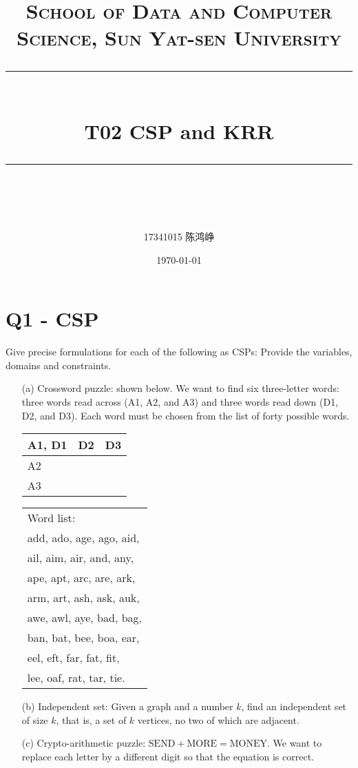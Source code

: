 \documentclass[a4paper, 11pt]{article}
\title{
\normalfont \normalsize
\textsc{School of Data and Computer Science, Sun Yat-sen University} \\ [25pt] %
\rule{\textwidth}{0.5pt} \\[0.4cm] %
\huge  T02 CSP and KRR\\ %
\rule{\textwidth}{2pt} \\[0.5cm] %
\author{17341015 陈鸿峥}
\date{\normalsize\today}
}
\begin{document}
\maketitle
\tableofcontents
\newpage

\begin{flushleft}
\end{flushleft}

\section{Q1 - CSP}
\begin{question}\normalfont
    Give precise formulations for each of the following as CSPs: Provide the variables, domains and constraints.
    \begin{itemize}
    \item [(a)] Crossword puzzle: shown below. We want to find six three-letter words: three words read across (A1, A2, and A3) and three words read down (D1, D2, and D3). Each word must be chosen from the list of forty possible words.
    \begin{center}
        {\scriptsize
        \begin{tabular}{|p{1cm}|p{1cm}|p{1cm}|}\hline
            A1, D1 & D2 & D3\\[1cm]\hline
            A2 & & \\[1cm]\hline
            A3 & & \\[1cm]\hline
        \end{tabular}}
        {\small
        \begin{tabular}{l}
            Word list:\\
            add, ado, age, ago, aid,\\
            ail, aim, air, and, any,\\
            ape, apt, arc, are, ark,\\
            arm, art, ash, ask, auk,\\
            awe, awl, aye, bad, bag,\\
            ban, bat, bee, boa, ear,\\
            eel, eft, far, fat, fit,\\
            lee, oaf, rat, tar, tie.
        \end{tabular}}
    \end{center}
    \item [(b)] Independent set: Given a graph and a number $k$, find an independent set of size $k$, that is, a set of $k$ vertices, no two of which are adjacent.
    \item [(c)] Crypto-arithmetic puzzle: $\text{SEND} + \text{MORE} = \text{MONEY}$. We want to replace each letter by a different digit so that the equation is correct.
    \end{itemize}
\end{question}
\end{document}
